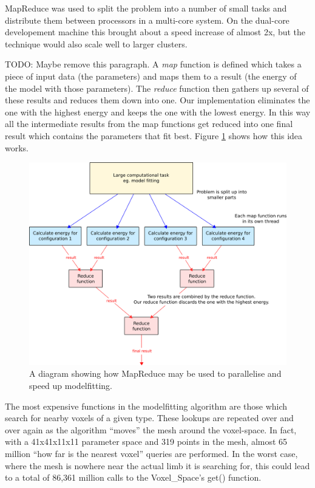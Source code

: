 \documentclass[a4paper,12pt]{article}
\begin{document}
MapReduce \cite{MapReduce} was used to split the problem into a number of small tasks and distribute them between processors in a multi-core system.
On the dual-core developement machine this brought about a speed increase of almost 2x, but the technique would also scale well to larger clusters.

TODO: Maybe remove this paragraph.
A \emph{map} function is defined which takes a piece of input data (the parameters) and maps them to a result (the energy of the model with those parameters).
The \emph{reduce} function then gathers up several of these results and reduces them down into one.
Our implementation eliminates the one with the highest energy and keeps the one with the lowest energy.
In this way all the intermediate results from the map functions get reduced into one final result which contains the parameters that fit best.
Figure \ref{MapReduceDiagram} shows how this idea works.

\begin{figure}[bt]
	\centering
	\includegraphics[width=\textwidth]{../report/mapreduce.png}
	\caption{A diagram showing how MapReduce may be used to parallelise and speed up modelfitting.}
	\label{MapReduceDiagram}
\end{figure}

\bigskip
The most expensive functions in the modelfitting algorithm are those which search for nearby voxels of a given type.
These lookups are repeated over and over again as the algorithm ``moves'' the mesh around the voxel-space.
In fact, with a 41x41x11x11 parameter space and 319 points in the mesh, almost 65 million ``how far is the nearest voxel'' queries are performed.
In the worst case, where the mesh is nowhere near the actual limb it is searching for, this could lead to a total of 86,361 million calls to the Voxel\_Space's get() function.
\end{document}
